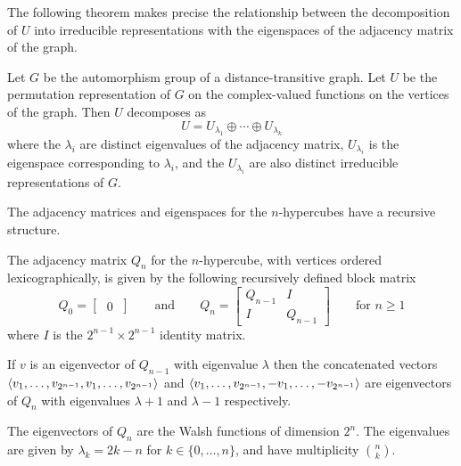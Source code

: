 \documentclass[cclicense]{hmcthesis}
\numberwithin{equation}{chapter}
\numberwithin{thmcounter}{chapter}
\begin{document}
    The following theorem makes precise the relationship between the
    decomposition of $U$ into irreducible representations with the eigenspaces
    of the adjacency matrix of the graph.
    \begin{theorem}
        Let $G$ be the automorphism group of a distance-transitive graph.  Let
        $U$ be the permutation representation of $G$ on the complex-valued
        functions on the vertices of the graph.  Then $U$ decomposes as
        \[
            U = U_{\lambda_1} \oplus \cdots \oplus U_{\lambda_k}
        \]
        where the $\lambda_i$ are distinct eigenvalues of the adjacency matrix,
        $U_{\lambda_i}$ is the eigenspace corresponding to $\lambda_i$, and the
        $U_{\lambda_i}$ are also distinct irreducible representations of $G$.
    \end{theorem}

    The adjacency matrices and eigenspaces for the $n$-hypercubes have a
    recursive structure.
    \begin{theorem}[\cite{CW06}]
        The adjacency matrix $Q_n$ for the $n$-hypercube, with vertices ordered
        lexicographically, is given by the following recursively defined block
        matrix
        \[
            Q_0 = \begin{bmatrix} \;0\; \end{bmatrix}
            \qquad
            \text{and}
            \qquad
            Q_n = \begin{bmatrix}
                Q_{n-1} & I \\
                I & Q_{n-1}
            \end{bmatrix}
            \qquad
            \text{for $n \ge 1$}
        \]
        where $I$ is the $2^{n-1}\times 2^{n-1}$ identity matrix.
    \end{theorem}

    \begin{theorem}[\cite{CW06}]
        If $v$ is an eigenvector of $Q_{n-1}$ with eigenvalue $\lambda$ then the
        concatenated vectors $\langle v_1, \ldots, v_{2^{n-1}},v_1, \ldots,
        v_{2^{n-1}}\rangle$ and $\langle v_1, \ldots, v_{2^{n-1}}, -v_1, \ldots,
        -v_{2^{n-1}}\rangle$ are eigenvectors of $Q_n$ with eigenvalues $\lambda +1$
        and $\lambda - 1$ respectively.
    \end{theorem}

    \begin{theorem}[\cite{CW06}]
        The eigenvectors of $Q_n$ are the Walsh functions of dimension $2^n$.
        The eigenvalues are given by $\lambda_k = 2k - n$ for $k \in \{0,
        \ldots, n\}$, and have multiplicity $\binom{n}{k}$.
    \end{theorem}
\end{document}
